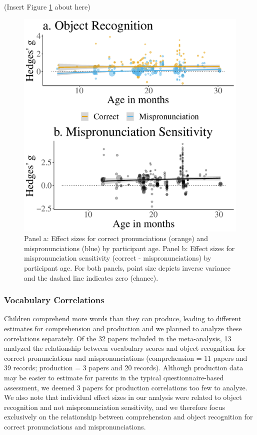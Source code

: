 \documentclass[man, noextraspace]{apa6}
\begin{document}
(Insert Figure \ref{fig:PlotMPEffect} about here)

\begin{figure}
\centering
\includegraphics{VonHolzenBergmann_MPMetaAnalysis_files/figure-latex/PlotMPEffect-1.pdf}
\caption{\label{fig:PlotMPEffect}Panel a: Effect sizes for correct pronunciations (orange) and mispronunciations (blue) by participant age. Panel b: Effect sizes for mispronunciation sensitivity (correct - mispronunciations) by participant age. For both panels, point size depicts inverse variance and the dashed line indicates zero (chance).}
\end{figure}

\hypertarget{vocabulary-correlations}{%
\subsubsection{Vocabulary Correlations}\label{vocabulary-correlations}}

Children comprehend more words than they can produce, leading to different estimates for comprehension and production and we planned to analyze these correlations separately. Of the 32 papers included in the meta-analysis, 13 analyzed the relationship between vocabulary scores and object recognition for correct pronunciations and mispronunciations (comprehension = 11 papers and 39 records; production = 3 papers and 20 records). Although production data may be easier to estimate for parents in the typical questionnaire-based assessment, we deemed 3 papers for production correlations too few to analyze. We also note that individual effect sizes in our analysis were related to object recognition and not mispronunciation sensitivity, and we therefore focus exclusively on the relationship between comprehension and object recognition for correct pronunciations and mispronunciations.
\end{document}
